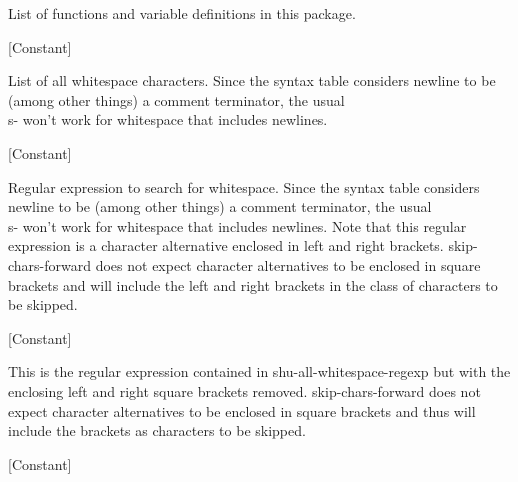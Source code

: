 List of functions and variable definitions in this package.



\vspace{1em}
\noindent
{}
\usebox{\funcname}
 \hfill [Constant]

\begin{doc-string}
List of all whitespace characters.
Since the syntax table considers newline to be (among other things) a
comment terminator, the usual \\s- won't work for whitespace that includes
newlines.
\end{doc-string}

\vspace{1em}
\noindent
{}
\usebox{\funcname}
 \hfill [Constant]

\begin{doc-string}
Regular expression to search for whitespace.  Since the syntax table considers
newline to be (among other things) a comment terminator, the usual \\s- won't work
for whitespace that includes newlines.  Note that this regular expression is a
character alternative enclosed in left and right brackets.  skip-chars-forward does
not expect character alternatives to be enclosed in square brackets and will include
the left and right brackets in the class of characters to be skipped.
\end{doc-string}

\vspace{1em}
\noindent
{}
\usebox{\funcname}
 \hfill [Constant]

\begin{doc-string}
This is the regular expression contained in shu-all-whitespace-regexp but with
the enclosing left and right square brackets removed.  skip-chars-forward does
not expect character alternatives to be enclosed in square brackets and thus
will include the brackets as characters to be skipped.
\end{doc-string}

\vspace{1em}
\noindent
{}
\usebox{\funcname}
 \hfill [Constant]


